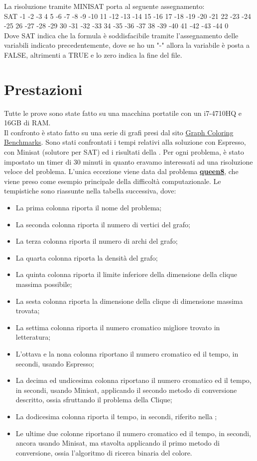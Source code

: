 \documentclass[a4paper,11pt]{article} %
\begin{document}
La risoluzione tramite MINISAT porta al seguente assegnamento:\\
SAT
-1 -2 -3 4 5 -6 -7 -8 -9 -10 11 -12 -13 -14 15 -16 17 -18 -19 -20 -21 22 -23 -24 -25 26 -27 -28 -29 30 -31 -32 -33 34 -35 -36 -37 38 -39 -40 41 -42 -43 -44 0\\
Dove SAT indica che la formula è soddisfacibile tramite l'assegnamento delle variabili indicato precedentemente, dove se ho un "-" allora la variabile è posta a FALSE, altrimenti a TRUE e lo zero indica la fine del file.

\pagebreak

\section{Prestazioni}
Tutte le prove sono state fatto su una macchina portatile con un i7-4710HQ e 16GB di RAM.\\
Il confronto è stato fatto su una serie di grafi presi dal sito \href{https://sites.google.com/site/graphcoloring/vertex-coloring}{Graph Coloring Benchmarks}\cite{site}. Sono stati confrontati i tempi relativi alla soluzione con Espresso, con Minisat \cite{minisat} (solutore per SAT) ed i risultati della \cite{tesi}.
Per ogni problema, è stato impostato un timer di 30 minuti in quanto eravamo interessati ad una risoluzione veloce del problema. L'unica eccezione viene data dal problema \href{https://it.wikipedia.org/wiki/Rompicapo_delle_otto_regine}{\textbf{queen8}}, che viene preso come esempio principale della difficoltà computazionale.
Le tempistiche sono riassunte nella tabella successiva, dove:
\begin{itemize}
	\item La prima colonna riporta il nome del problema;
	\item La seconda colonna riporta il numero di vertici del grafo;
	\item La terza colonna riporta il numero di archi del grafo;
	\item La quarta colonna riporta la densità del grafo;
	\item La quinta colonna riporta il limite inferiore della dimensione della clique massima possibile;
	\item La sesta colonna riporta la dimensione della clique di dimensione massima trovata;
	\item La settima colonna riporta il numero cromatico migliore trovato in letteratura;
	\item L'ottava e la nona colonna riportano il numero cromatico ed il tempo, in secondi, usando Espresso;
	\item La decima ed undicesima colonna riportano il numero cromatico ed il tempo, in secondi, usando Minisat, applicando il secondo metodo di conversione descritto, ossia sfruttando il problema della Clique;
	\item La dodicesima colonna riporta il tempo, in secondi, riferito nella \cite{tesi};
	\item Le ultime due colonne riportano il numero cromatico ed il tempo, in secondi, ancora usando Minisat, ma stavolta applicando il primo metodo di conversione, ossia l'algoritmo di ricerca binaria del colore.
\end{itemize}
\end{document}
